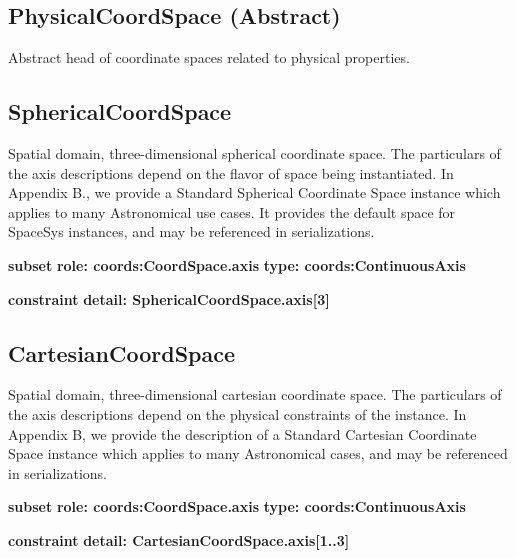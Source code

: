   \subsection{PhysicalCoordSpace (Abstract)}
  \label{sect:PhysicalCoordSpace}
    Abstract head of coordinate spaces related to physical properties.


  \subsection{SphericalCoordSpace}
  \label{sect:SphericalCoordSpace}
    Spatial domain, three-dimensional spherical coordinate space. The particulars of the axis descriptions depend on the flavor of space being instantiated. In Appendix B., we provide a Standard Spherical Coordinate Space instance which applies to many Astronomical use cases. It provides the default space for SpaceSys instances, and may be referenced in serializations.

    \noindent \textbf{subset} \newline
    \indent   \textbf{role: coords:CoordSpace.axis} \newline
    \indent   \textbf{type: coords:ContinuousAxis} \newline


    \noindent \textbf{constraint} \newline
    \indent    \textbf{detail: SphericalCoordSpace.axis[3] }\newline


  \subsection{CartesianCoordSpace}
  \label{sect:CartesianCoordSpace}
    Spatial domain, three-dimensional cartesian coordinate space. The particulars of the axis descriptions depend on the physical constraints of the instance. In Appendix B, we provide the description of a Standard Cartesian Coordinate Space instance which applies to many Astronomical cases, and may be referenced in serializations.

    \noindent \textbf{subset} \newline
    \indent   \textbf{role: coords:CoordSpace.axis} \newline
    \indent   \textbf{type: coords:ContinuousAxis} \newline


    \noindent \textbf{constraint} \newline
    \indent    \textbf{detail: CartesianCoordSpace.axis[1..3] }\newline


